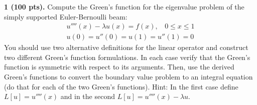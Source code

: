 \pagestyle{fancy}
\setlength{\headheight}{16pt}
\fancyhead{} %
\fancyfoot{} %
\fancyfoot[C]{\thepage}

\begin{problem}
    \textbf{1 (100 pts).} 
    Compute the Green's function for the eigenvalue problem of the simply supported Euler-Bernoulli beam:
    \begin{equation}
    \begin{gathered}
        u''''(x) - \lambda u(x) = f(x), ~~~~ 0 \leq x \leq 1 \\
        u(0) = u''(0) = u(1) = u''(1) = 0
    \end{gathered}
    \end{equation}
    You should use two alternative definitions for the linear operator and construct two different Green's function formulations. 
    In each case verify that the Green's function is symmetric with respect to its arguments. 
    Then, use the derived Green's functions to convert the boundary value problem to an integral equation (do that for each of the two Green's functions). 
    Hint: In the first case define $L[u] = u''''(x)$ and in the second $L[u] = u''''(x) - \lambda u$.
\end{problem}
